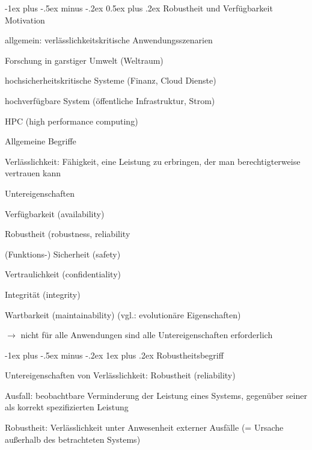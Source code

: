 \documentclass[a4paper]{article}
\makeatletter
\renewcommand{\section}{\@startsection{section}{1}{0mm}%
 {-1ex plus -.5ex minus -.2ex}%
 {0.5ex plus .2ex}%
 {\normalfont\large\bfseries}}
\renewcommand{\subsubsection}{\@startsection{subsubsection}{3}{0mm}%
 {-1ex plus -.5ex minus -.2ex}%
 {1ex plus .2ex}%
 {\normalfont\small\bfseries}}
\makeatother
\begin{document}
\begin{multicols}{3}
    \section{Robustheit und Verfügbarkeit}
    Motivation
    \begin{itemize*}
        \item allgemein: verlässlichkeitskritische Anwendungsszenarien
        \item Forschung in garstiger Umwelt (Weltraum)
        \item hochsicherheitskritische Systeme (Finanz, Cloud Dienste)
        \item hochverfügbare System (öffentliche Infrastruktur, Strom)
        \item HPC (high performance computing)
    \end{itemize*}

    Allgemeine Begriffe
    \begin{itemize*}
        \item Verlässlichkeit: Fähigkeit, eine Leistung zu erbringen, der man berechtigterweise vertrauen kann
        \item Untereigenschaften
        \begin{enumerate*}
            \item Verfügbarkeit (availability)
            \item Robustheit (robustness, reliability
            \item (Funktions-) Sicherheit (safety)
            \item Vertraulichkeit (confidentiality)
            \item Integrität (integrity)
            \item Wartbarkeit (maintainability) (vgl.: evolutionäre Eigenschaften)
        \end{enumerate*}
        \item[$\rightarrow$] nicht für alle Anwendungen sind alle Untereigenschaften erforderlich
    \end{itemize*}

    \subsubsection{Robustheitsbegriff}
    \begin{itemize*}
        \item Untereigenschaften von Verlässlichkeit: Robustheit (reliability)
        \item Ausfall: beobachtbare Verminderung der Leistung eines Systems, gegenüber seiner als korrekt spezifizierten Leistung
        \item Robustheit: Verlässlichkeit unter Anwesenheit externer Ausfälle (= Ursache außerhalb des betrachteten Systems)
    \end{itemize*}


\end{multicols}
\end{document}
